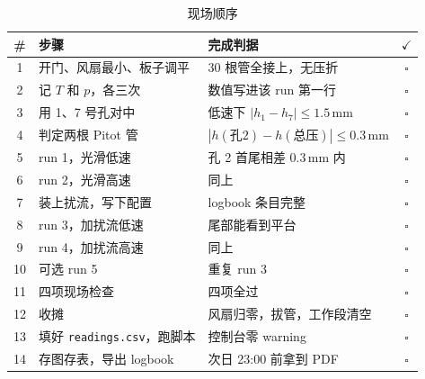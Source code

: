 \documentclass[11pt,a4paper]{ctexart}
\begin{document}
\begin{table}[H]
\centering
\caption{现场顺序}
\small
\begin{tabularx}{\textwidth}{@{}c X p{5.0cm} c@{}}
\toprule
\# & 步骤 & 完成判据 & $\checkmark$ \\
\midrule
1 & 开门、风扇最小、板子调平 & 30 根管全接上，无压折 & $\square$ \\
2 & 记 $T$ 和 $p$，各三次 & 数值写进该 run 第一行 & $\square$ \\
3 & 用 1、7 号孔对中 & 低速下 $|h_1 - h_7| \leq 1.5$\,mm & $\square$ \\
4 & 判定两根 Pitot 管 & $|h(\text{孔2}) - h(\text{总压})| \leq 0.3$\,mm & $\square$ \\
5 & run 1，光滑低速 & 孔 2 首尾相差 0.3\,mm 内 & $\square$ \\
6 & run 2，光滑高速 & 同上 & $\square$ \\
7 & 装上扰流，写下配置 & logbook 条目完整 & $\square$ \\
8 & run 3，加扰流低速 & 尾部能看到平台 & $\square$ \\
9 & run 4，加扰流高速 & 同上 & $\square$ \\
10 & 可选 run 5 & 重复 run 3 & $\square$ \\
11 & 四项现场检查 & 四项全过 & $\square$ \\
12 & 收摊 & 风扇归零，拔管，工作段清空 & $\square$ \\
13 & 填好 \texttt{readings.csv}，跑脚本 & 控制台零 warning & $\square$ \\
14 & 存图存表，导出 logbook & 次日 23:00 前拿到 PDF & $\square$ \\
\bottomrule
\end{tabularx}
\end{table}
\end{document}
